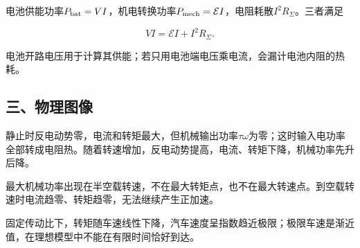 \documentclass[12pt,a4paper,fontset=fandol]{ctexart}
\begin{document}
电池供能功率\(P_{\rm bat}=VI\)，机电转换功率\(P_{\rm mech}=\mathcal EI\)，电阻耗散\(I^2R_\Sigma\)。三者满足

\[
VI=\mathcal EI+I^2R_\Sigma.
\]

电池开路电压用于计算其供能；若只用电池端电压乘电流，会漏计电池内阻的热耗。

\subsection{三、物理图像}\label{ux4e09ux7269ux7406ux56feux50cf-7}

静止时反电动势零，电流和转矩最大，但机械输出功率\(\tau\omega\)为零；这时输入电功率全部转成电阻热。随着转速增加，反电动势提高，电流、转矩下降，机械功率先升后降。

\begin{center}
\begin{minipage}{\linewidth}
\centering\begingroup{}
\ifdim\wd\diagrambox>.88\linewidth
\sbox{\diagrambox}{\resizebox{.88\linewidth}{!}{\usebox{\diagrambox}}}\fi
\ifdim\ht\diagrambox>.38\textheight
\resizebox{!}{.38\textheight}{\usebox{\diagrambox}}
\else\usebox{\diagrambox}\fi
\par{}\endgroup\end{minipage}\end{center}

最大机械功率出现在半空载转速，不在最大转矩点，也不在最大转速点。到空载转速时电流趋零、转矩趋零，无法继续产生正加速。

固定传动比下，转矩随车速线性下降，汽车速度呈指数趋近极限；极限车速是渐近值，在理想模型中不能在有限时间恰好到达。
\end{document}
